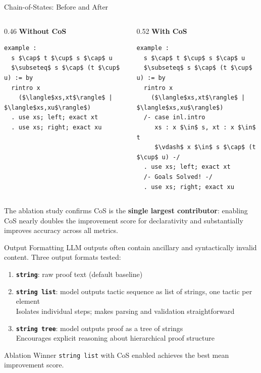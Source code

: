 \begin{frame}[fragile]{Chain-of-States: Before and After}
\begin{columns}[T]
\begin{column}{0.46\textwidth}
\textbf{Without CoS}
\begin{lstlisting}[basicstyle=\footnotesize\ttfamily]
example :
  s $\cap$ t $\cup$ s $\cap$ u
  $\subseteq$ s $\cap$ (t $\cup$ u) := by
  rintro x
    ($\langle$xs,xt$\rangle$ | $\langle$xs,xu$\rangle$)
  . use xs; left; exact xt
  . use xs; right; exact xu
\end{lstlisting}
\end{column}
\begin{column}{0.52\textwidth}
\textbf{With CoS}
\begin{lstlisting}[basicstyle=\footnotesize\ttfamily]
example :
  s $\cap$ t $\cup$ s $\cap$ u
  $\subseteq$ s $\cap$ (t $\cup$ u) := by
  rintro x
    ($\langle$xs,xt$\rangle$ | $\langle$xs,xu$\rangle$)
  /- case inl.intro
     xs : x $\in$ s, xt : x $\in$ t
     $\vdash$ x $\in$ s $\cap$ (t $\cup$ u) -/
  . use xs; left; exact xt
  /- Goals Solved! -/
  . use xs; right; exact xu
\end{lstlisting}
\end{column}
\end{columns}
\vspace{0.4em}
\small The ablation study confirms CoS is the \textbf{single largest contributor}: enabling CoS nearly doubles the improvement score for declarativity and substantially improves accuracy across all metrics.
\end{frame}

\begin{frame}{Output Formatting}
\vspace{0.5em}
LLM outputs often contain ancillary and syntactically invalid content. Three output formats tested:
\vspace{0.5em}
\begin{enumerate}\setlength{\itemsep}{10pt}
  \item \textbf{\texttt{string}}: raw proof text (default baseline)
  \item \textbf{\texttt{string list}}: model outputs tactic sequence as list of strings, one tactic per element\\
    \small Isolates individual steps; makes parsing and validation straightforward
  \item \textbf{\texttt{string tree}}: model outputs proof as a tree of strings\\
    \small Encourages explicit reasoning about hierarchical proof structure
\end{enumerate}
\vspace{0.5em}
\begin{block}{Ablation Winner}
  \texttt{string list} with CoS enabled achieves the best mean improvement score.
\end{block}
\end{frame}

